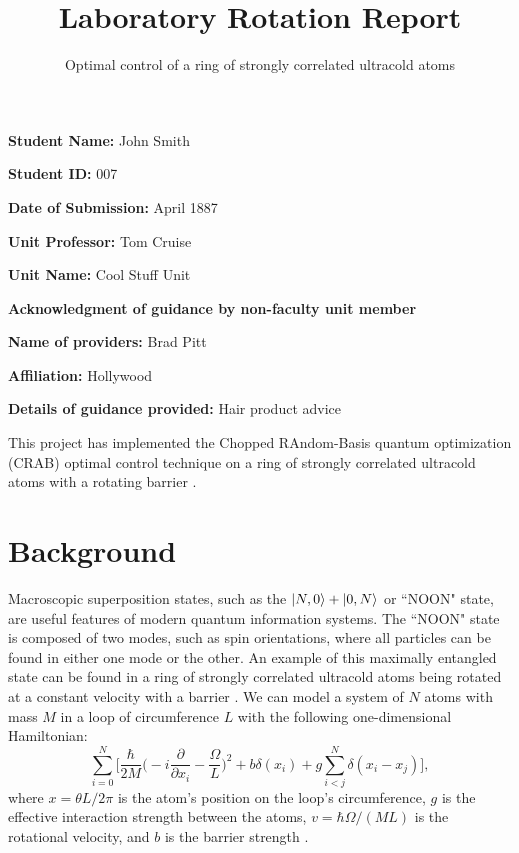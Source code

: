 \documentclass[paper=a4wide, fontsize=12pt]{scrartcl}	 %
\title{\vspace{-1.8cm}  \color{DarkRed} Laboratory Rotation Report}
\subtitle{Optimal control of a ring of strongly correlated ultracold atoms %
\vspace{-2cm} }
\date{} %
\begin{document}
\maketitle %
\thispagestyle{fancy} %


\vspace{-0.5cm} \textbf{Student Name:}  John Smith

\textbf{Student ID:} 007

\textbf{Date of Submission:} April 1887

 \textbf{Unit Professor:} Tom Cruise

\textbf{Unit Name:} Cool Stuff Unit

\vspace{3mm} \textbf{Acknowledgment of guidance by non-faculty unit member} 

\textbf{Name of providers:} Brad Pitt

\textbf{Affiliation:} Hollywood

\textbf{Details of guidance provided:}	 Hair product advice

\vspace{0.5cm}


This project has implemented the Chopped RAndom-Basis quantum optimization (CRAB) optimal control technique \cite{CRAB} on a ring of strongly correlated ultracold atoms with a rotating barrier \cite{RING}.


\section*{Background}
Macroscopic superposition states, such as the $\ket{N,0} + \ket{0,N}$ or ``NOON" state, are useful features of modern quantum information systems. The ``NOON" state is composed of two modes, such as spin orientations, where all particles can be found in either one mode or the other. An example of this maximally entangled state can be found in a ring of strongly correlated ultracold atoms being rotated at a constant velocity with a barrier \cite{RING}. We can model a system of $N$ atoms with mass $M$ in a loop of circumference $L$ with the following one-dimensional Hamiltonian\cite{RING}:
$$\sum_{i=0} ^{N} \bigg[{\frac{\hbar}{2M}\bigg(-i\frac{\partial}{\partial x_i}-\frac{\Omega}{L}}\bigg)^2 + b\delta(x_i) +g \sum_{i<j} ^{N} \delta (x_i - x_j )\bigg],$$
where $x = \theta L / 2 \pi$ is the atom's position on the loop's circumference, $g$ is the effective interaction strength between the atoms, $v = \hbar \Omega/(ML)$ is the rotational velocity, and $b$ is the barrier strength \cite{RING}. 
\end{document}
